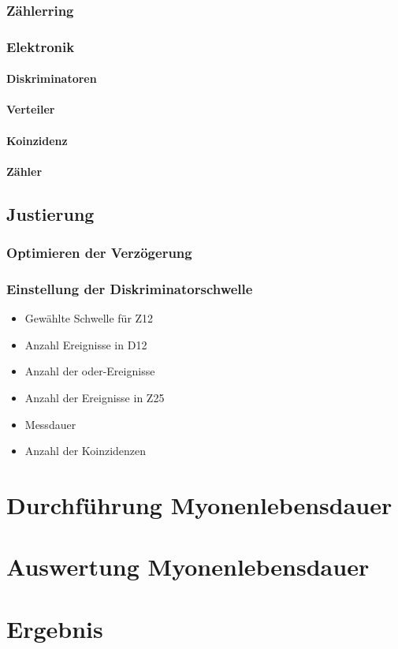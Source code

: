 \documentclass[11pt, ngerman, fleqn, DIV=15, headinclude, BCOR=2cm]{scrreprt}
\begin{document}
\subsection{Zählerring}

\subsection{Elektronik}

\subsubsection{Diskriminatoren}

\subsubsection{Verteiler}

\subsubsection{Koinzidenz}

\subsubsection{Zähler}

\section{Justierung}

\subsection{Optimieren der Verzögerung}
\label{sec:optimieren_verzoegerung}

\subsection{Einstellung der Diskriminatorschwelle}
\label{sec:einstellung_diskriminatorschwelle}

\begin{itemize}
    \item
        Gewählte Schwelle für Z12

    \item
        Anzahl Ereignisse in D12

    \item
        Anzahl der oder-Ereignisse

    \item
        Anzahl der Ereignisse in Z25

    \item
        Messdauer

    \item
        Anzahl der Koinzidenzen
\end{itemize}

\chapter{Durchführung Myonenlebensdauer}

\chapter{Auswertung Myonenlebensdauer}

\chapter{Ergebnis}
\end{document}

